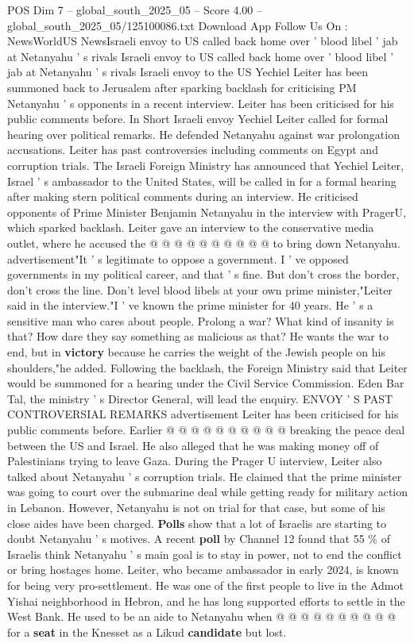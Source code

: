 \begin{textsample}{POS Dim 7 – global\_south\_2025\_05 – Score 4.00 – global\_south\_2025\_05/125100086.txt}  \label{ex:f7_pos_437}
Download App Follow Us On : NewsWorldUS NewsIsraeli envoy to US called back home over ' blood libel ' jab at Netanyahu ' s rivals Israeli envoy to US called back home over ' blood libel ' jab at Netanyahu ' s rivals Israeli envoy to the US Yechiel Leiter has been summoned back to Jerusalem after sparking backlash for criticising PM Netanyahu ' s opponents in a recent interview.
Leiter has been criticised for his public comments before.
In Short Israeli envoy Yechiel Leiter called for formal hearing over political remarks.
He defended Netanyahu against war prolongation accusations.
Leiter has past controversies including comments on Egypt and corruption trials.
The Israeli Foreign Ministry has announced that Yechiel Leiter, Israel ' s ambassador to the United States, will be called in for a formal hearing after making stern political comments during an interview.
He criticised opponents of Prime Minister Benjamin Netanyahu in the interview with PragerU, which sparked backlash.
Leiter gave an interview to the conservative media outlet, where he accused the @ @ @ @ @ @ @ @ @ @ to bring down Netanyahu. advertisement"It ' s legitimate to oppose a government.
I ' ve opposed governments in my political career, and that ' s fine.
But don't cross the border, don't cross the line.
Don't level blood libels at your own prime minister,"Leiter said in the interview."I ' ve known the prime minister for 40 years.
He ' s a sensitive man who cares about people.
Prolong a war?
What kind of insanity is that?
How dare they say something as malicious as that?
He wants the war to end, but in \textbf{victory} because he carries the weight of the Jewish people on his shoulders,"he added.
Following the backlash, the Foreign Ministry said that Leiter would be summoned for a hearing under the Civil Service Commission.
Eden Bar Tal, the ministry ' s Director General, will lead the enquiry.
ENVOY ' S PAST CONTROVERSIAL REMARKS advertisement Leiter has been criticised for his public comments before.
Earlier @ @ @ @ @ @ @ @ @ @ breaking the peace deal between the US and Israel.
He also alleged that he was making money off of Palestinians trying to leave Gaza.
During the Prager U interview, Leiter also talked about Netanyahu ' s corruption trials.
He claimed that the prime minister was going to court over the submarine deal while getting ready for military action in Lebanon.
However, Netanyahu is not on trial for that case, but some of his close aides have been charged. \textbf{Polls} show that a lot of Israelis are starting to doubt Netanyahu ' s motives.
A recent \textbf{poll} by Channel 12 found that 55 \% of Israelis think Netanyahu ' s main goal is to stay in power, not to end the conflict or bring hostages home.
Leiter, who became ambassador in early 2024, is known for being very pro-settlement.
He was one of the first people to live in the Admot Yishai neighborhood in Hebron, and he has long supported efforts to settle in the West Bank.
He used to be an aide to Netanyahu when @ @ @ @ @ @ @ @ @ @ for a \textbf{seat} in the Knesset as a Likud \textbf{candidate} but lost.

\end{textsample}
